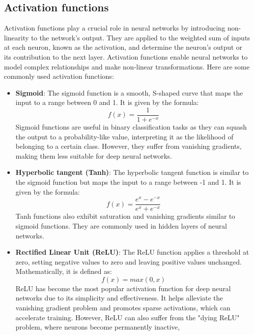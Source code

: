 \documentclass[a4paper, noexaminfo]{sapthesis}
\begin{document}
\subsection{Activation functions} \label{sec:activation}
Activation functions play a crucial role in neural networks by 
introducing non-linearity to the network's output. They are applied 
to the weighted sum of inputs at each neuron, known as the activation, 
and determine the neuron's output or its contribution to the next layer. 
Activation functions enable neural networks to model complex relationships 
and make non-linear transformations.\newline
Here are some commonly used activation functions:
\begin{itemize}
\item \textbf{Sigmoid}: The sigmoid function is a smooth, S-shaped curve 
that maps the input to a range between 0 and 1. It is given by the formula:
\begin{equation}
f(x)=\frac{1}{1+e^{-x}}
\end{equation}
Sigmoid functions are useful in binary classification tasks as 
they can squash the output to a probability-like value, interpreting 
it as the likelihood of belonging to a certain class. However, they 
suffer from vanishing gradients, making them less suitable for deep 
neural networks.
\item \textbf{Hyperbolic tangent (Tanh)}: The hyperbolic tangent function 
is similar to the sigmoid function but maps the input to a range between 
-1 and 1. It is given by the formula:
\begin{equation}
f(x)=\frac{e^x-e^{-x}}{e^x+e^{-x}}
\end{equation}
Tanh functions also exhibit saturation and vanishing gradients 
similar to sigmoid functions. They are commonly used in hidden layers 
of neural networks.
\item \textbf{Rectified Linear Unit (ReLU)}: The ReLU function applies a 
threshold at zero, setting negative values to zero and leaving positive 
values unchanged. Mathematically, it is defined as:
\begin{equation}
f(x)=max(0,x)
\end{equation}
ReLU has become the most popular activation function for deep neural 
networks due to its simplicity and effectiveness. It helps alleviate 
the vanishing gradient problem and promotes sparse activations, which 
can accelerate training. However, ReLU can also suffer from the 
"dying ReLU" problem, where neurons become permanently inactive, 

\end{itemize}
\end{document}
